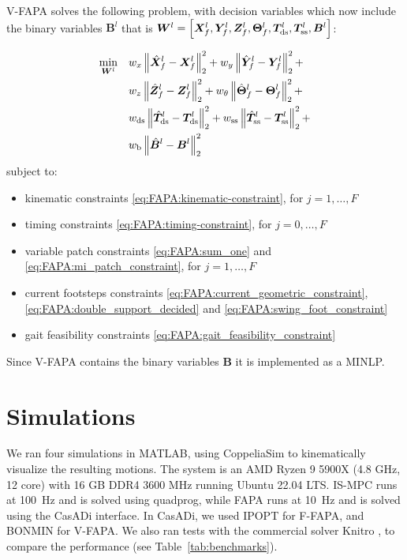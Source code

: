 V-FAPA solves the following problem, with decision variables which now include
the binary variables $\bm{B}^{l}$ that is ${\bm{W}}^l = \left[\bm{X}_f^l, \bm{Y}_f^l, \bm{Z}_f^l, \bm{\Theta}_f^l, \bm{T}_{\rm ds}^l, \bm{T}_{\rm ss}^l, \bm{B}^{l}\right]$:
\begin{braced}
    \begin{equation*}
        \begin{split}
            \min_{{\bm{W}}^l} \quad
            & w_x \left\| \hat{\bm{X}}_f^l - \bm{X}_f^l \right\|_2^2 + w_y \left\| \hat{\bm{Y}}_f^l - \bm{Y}_f^l \right\|_2^2 + \\& w_z \left\| \hat{\bm{Z}}_f^l - \bm{Z}_f^l \right\|_2^2 + w_{\theta} \left\| \hat{\bm{\Theta}}_f^l - \bm{\Theta}_f^l \right\|_2^2 + \\& w_{\rm ds} \left\| \hat{\bm{T}}_{\rm ds}^l - \bm{T}_{\rm ds}^l \right\|_2^2 + w_{\rm ss} \left\| \hat{\bm{T}}_{\rm ss}^l - \bm{T}_{\rm ss}^l \right\|_2^2 +  \\&
            w_{\rm b} \left\| \hat{\bm{B}}^l - \bm{B}^l \right\|_2^2
        \end{split}
    \end{equation*}
    \hspace{0.25cm} subject to:
    \begin{itemize}
        \item kinematic constraints \eqref{eq:FAPA:kinematic-constraint}, for $j=1,\dots,F$
        \item timing constraints \eqref{eq:FAPA:timing-constraint}, for $j=0,\dots,F$
        \item variable patch constraints \eqref{eq:FAPA:sum_one} and \eqref{eq:FAPA:mi_patch_constraint}, for $j=1,\dots,F$
        \item current footsteps constraints \eqref{eq:FAPA:current_geometric_constraint}, \eqref{eq:FAPA:double_support_decided} and \eqref{eq:FAPA:swing_foot_constraint}
        \item gait feasibility constraints \eqref{eq:FAPA:gait_feasibility_constraint}
    \end{itemize}
\end{braced}

\medskip

Since V-FAPA contains the binary variables $\bm{B}$ it is implemented as a MINLP.

\section{Simulations}
\label{sec:FAPA:Simulations}
We ran four simulations in MATLAB, using CoppeliaSim to kinematically
visualize the resulting motions. The system is an AMD Ryzen 9 5900X
(4.8 GHz, 12 core) with 16 GB DDR4 3600 MHz running Ubuntu 22.04 LTS. IS-MPC
runs at 100~Hz and is solved using quadprog, while FAPA runs at
10~Hz and is solved using the CasADi interface. In CasADi, we used
IPOPT \cite{Wachter2006IPOPT} for F-FAPA, and BONMIN \cite{Ahmed2022BONMIN}
for V-FAPA. We also ran tests
with the commercial solver Knitro \cite{Byrd2006Knitro}, to compare the performance
(see Table~\ref{tab:benchmarks}).

